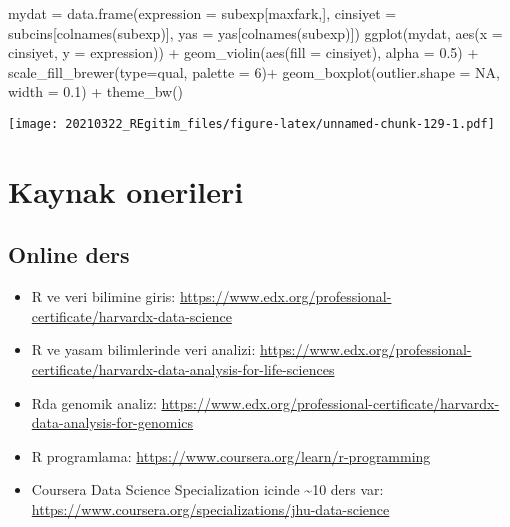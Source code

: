\documentclass[
]{book}
\newenvironment{Shaded}{\begin{snugshade}}{\end{snugshade}}
\newcommand{\AttributeTok}[1]{\textcolor[rgb]{0.77,0.63,0.00}{#1}}
\newcommand{\ConstantTok}[1]{\textcolor[rgb]{0.00,0.00,0.00}{#1}}
\newcommand{\DecValTok}[1]{\textcolor[rgb]{0.00,0.00,0.81}{#1}}
\newcommand{\FloatTok}[1]{\textcolor[rgb]{0.00,0.00,0.81}{#1}}
\newcommand{\FunctionTok}[1]{\textcolor[rgb]{0.00,0.00,0.00}{#1}}
\newcommand{\NormalTok}[1]{#1}
\newcommand{\OtherTok}[1]{\textcolor[rgb]{0.56,0.35,0.01}{#1}}
\newcommand{\SpecialCharTok}[1]{\textcolor[rgb]{0.00,0.00,0.00}{#1}}
\newcommand{\StringTok}[1]{\textcolor[rgb]{0.31,0.60,0.02}{#1}}
\begin{document}
\begin{Shaded}
\begin{Highlighting}[]
\NormalTok{mydat }\OtherTok{=} \FunctionTok{data.frame}\NormalTok{(}\AttributeTok{expression =}\NormalTok{ subexp[maxfark,], }
                   \AttributeTok{cinsiyet =}\NormalTok{ subcins[}\FunctionTok{colnames}\NormalTok{(subexp)], }
                   \AttributeTok{yas =}\NormalTok{ yas[}\FunctionTok{colnames}\NormalTok{(subexp)])}
\FunctionTok{ggplot}\NormalTok{(mydat, }\FunctionTok{aes}\NormalTok{(}\AttributeTok{x =}\NormalTok{ cinsiyet, }\AttributeTok{y =}\NormalTok{ expression)) }\SpecialCharTok{+}
  \FunctionTok{geom\_violin}\NormalTok{(}\FunctionTok{aes}\NormalTok{(}\AttributeTok{fill =}\NormalTok{ cinsiyet), }\AttributeTok{alpha =} \FloatTok{0.5}\NormalTok{) }\SpecialCharTok{+}
  \FunctionTok{scale\_fill\_brewer}\NormalTok{(}\AttributeTok{type=}\StringTok{\textquotesingle{}qual\textquotesingle{}}\NormalTok{, }\AttributeTok{palette =} \DecValTok{6}\NormalTok{)}\SpecialCharTok{+}
  \FunctionTok{geom\_boxplot}\NormalTok{(}\AttributeTok{outlier.shape =} \ConstantTok{NA}\NormalTok{, }\AttributeTok{width =} \FloatTok{0.1}\NormalTok{) }\SpecialCharTok{+}
  \FunctionTok{theme\_bw}\NormalTok{()}
\end{Highlighting}
\end{Shaded}

\texttt{[image: 20210322\_REgitim\_files/figure-latex/unnamed-chunk-129-1.pdf]}

\hypertarget{kaynak-onerileri}{%
\chapter{Kaynak onerileri}\label{kaynak-onerileri}}

\hypertarget{online-ders}{%
\section{Online ders}\label{online-ders}}

\begin{itemize}
\item
  R ve veri bilimine giris: \url{https://www.edx.org/professional-certificate/harvardx-data-science}
\item
  R ve yasam bilimlerinde veri analizi: \url{https://www.edx.org/professional-certificate/harvardx-data-analysis-for-life-sciences}
\item
  Rda genomik analiz: \url{https://www.edx.org/professional-certificate/harvardx-data-analysis-for-genomics}
\item
  R programlama: \url{https://www.coursera.org/learn/r-programming}
\item
  Coursera Data Science Specialization icinde \textasciitilde10 ders var: \url{https://www.coursera.org/specializations/jhu-data-science}
\end{itemize}
\end{document}
